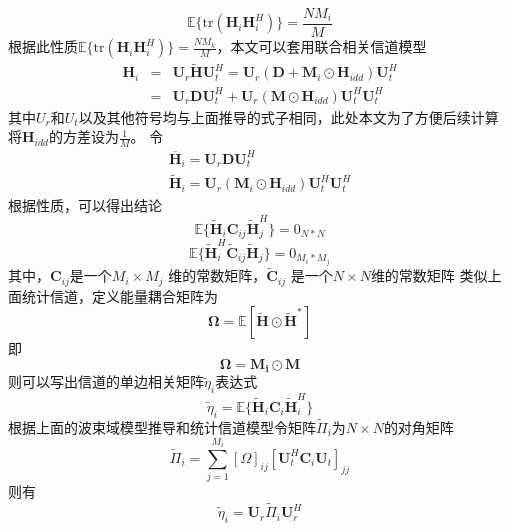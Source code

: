 \documentclass[bachelor,nocolorlinks, printoneside]{seuthesis} %
\begin{document}
\begin{Main}
\begin{equation}
\mathbb{E} \lbrace \mathrm{tr} (\mathbf{H}_i \mathbf{H}_i^H ) \rbrace = \frac{N M_i}{M}
\end{equation}
根据此性质$\mathbb{E} \lbrace \mathrm{tr} (\mathbf{H}_i \mathbf{H}_i^H ) \rbrace = \frac{N M_k}{M}$，本文可以套用联合相关信道模型
\begin{eqnarray}\label{key}
\mathbf{H}_i & = & \mathbf{U}_{r}\tilde{\mathbf{H}}\mathbf{U}_{t}^{H} = \mathbf{U}_{r}(\mathbf{D}+\mathbf{M}_i\odot \mathbf{H}_{idd})\mathbf{U}_{t}^{H} \\ \nonumber
& = & \mathbf{U}_{r}\mathbf{D}\mathbf{U}_{t}^{H} + \mathbf{U}_{r}(\mathbf{M}\odot \mathbf{H}_{idd})\mathbf{U}_{t}^{H}\mathbf{U}_{t}^{H}
\end{eqnarray}
其中$U_r$和$U_t$以及其他符号均与上面推导的式子相同，此处本文为了方便后续计算将$\mathbf{H}_{idd}$的方差设为$\frac{1}{M}$。
令
\begin{gather}\label{key}
\overline{\mathbf{H}}_i = \mathbf{U}_{r}\mathbf{D}\mathbf{U}_{t}^{H} \\
\tilde{\mathbf{H}}_i = \mathbf{U}_{r}(\mathbf{M}_i\odot \mathbf{H}_{idd})\mathbf{U}_{t}^{H}\mathbf{U}_{t}^{H}
\end{gather}
根据性质，可以得出结论
\begin{equation}\label{key}
\mathbb{E} \lbrace \tilde{\mathbf{H}}_i \mathbf{C}_{ij} \tilde{\mathbf{H}}_j^{H} \rbrace = 0_{N*N}
\end{equation}
\begin{equation}\label{key}
\mathbb{E} \lbrace \tilde{\mathbf{H}}_i^{H} \tilde{\mathbf{C}}_{ij} \tilde{\mathbf{H}}_j \rbrace = 0_{M_i*M_j}
\end{equation}
其中，$\mathbf{C}_{ij}$是一个$M_i \times M_j$ 维的常数矩阵，$\tilde{\mathbf{C}}_{ij}$ 是一个$N \times N$维的常数矩阵
类似上面统计信道，定义能量耦合矩阵为
\begin{equation}\label{key}
\bm{\Omega} =\mathbb{E}[\tilde{\mathbf{H}} \odot \tilde{\mathbf{H}}^{*}]
\end{equation}
即
\begin{equation}\label{key}
\bm{\Omega} =\mathbf{M_i} \odot \mathbf{M}
\end{equation}
则可以写出信道的单边相关矩阵$\tilde{\eta}_i$表达式
\begin{equation}\label{key}
\tilde{\eta}_i = \mathbb{E} \lbrace \tilde{\mathbf{H}}_i \mathbf{C}_i \tilde{\mathbf{H}}_i^H \rbrace
\end{equation}
根据上面的波束域模型推导和统计信道模型令矩阵$\tilde{\Pi}_i$为$N \times N$的对角矩阵
\begin{equation}\label{key}
\tilde{\Pi}_i = \sum_{j=1}^{M_i}[\Omega]_{ij}  [\mathbf{U}_t^H \mathbf{C}_i \mathbf{U}_t]_{jj}
\end{equation}
则有
\begin{equation}\label{key}
\tilde{\eta}_i = \mathbf{U}_r \tilde{\Pi}_i \mathbf{U}_r^H
\end{equation}

\end{Main}
\end{document}
